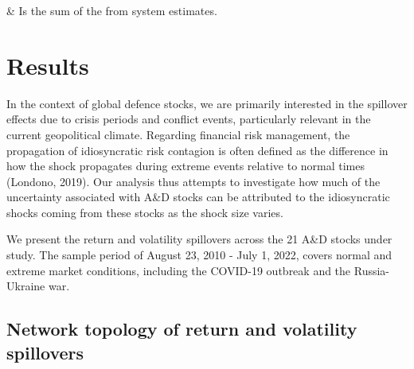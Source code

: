 \documentclass[
  letterpaper,
  DIV=11,
  numbers=noendperiod]{scrartcl}
\begin{document}
\begin{longtable}[]
                                                                                                                                                                                                                                                                                                                                                                                                                                                                                                                                                                                                                                                                                                                                                                                                                                                                                                                                                                                                                                                                                                              \)
& Is the sum of the from system estimates. \\
\end{longtable}

\hypertarget{results}{%
\section{Results}\label{results}}

In the context of global defence stocks, we are primarily interested in
the spillover effects due to crisis periods and conflict events,
particularly relevant in the current geopolitical climate. Regarding
financial risk management, the propagation of idiosyncratic risk
contagion is often defined as the difference in how the shock propagates
during extreme events relative to normal times (Londono, 2019). Our
analysis thus attempts to investigate how much of the uncertainty
associated with A\&D stocks can be attributed to the idiosyncratic
shocks coming from these stocks as the shock size varies.

We present the return and volatility spillovers across the 21 A\&D
stocks under study. The sample period of August 23, 2010 - July 1, 2022,
covers normal and extreme market conditions, including the COVID-19
outbreak and the Russia-Ukraine war.

\hypertarget{network-topology-of-return-and-volatility-spillovers}{%
\subsection{Network topology of return and volatility
spillovers}\label{network-topology-of-return-and-volatility-spillovers}}
\end{document}
